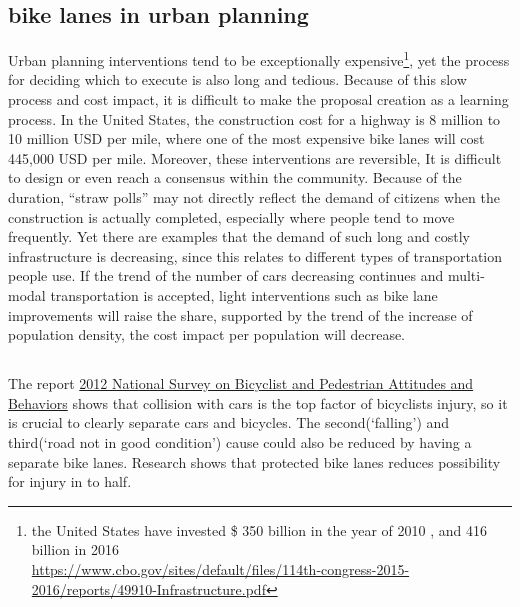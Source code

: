 \subsection{bike lanes in urban planning}
Urban planning interventions tend to be exceptionally expensive\footnote{the United States have invested \$ 350 billion in the year of 2010 \cite{musick2010public}, and 416 billion in 2016\\ \url{https://www.cbo.gov/sites/default/files/114th-congress-2015-2016/reports/49910-Infrastructure.pdf}}, yet the process for deciding which to execute is also long and tedious. Because of this slow process and cost impact, it is difficult to make the proposal creation as a learning process. In the United States, the construction cost for a highway is 8 million to 10 million USD per mile, where one of the most expensive bike lanes will cost 445,000 USD per mile. Moreover, these interventions are reversible, 
 It is difficult to design or even reach a consensus within the community. Because of the duration, ``straw polls'' may not directly reflect the demand of citizens when the construction is actually completed, especially where people tend to move frequently. Yet there are examples that the demand of such long and costly infrastructure is decreasing, since this relates to different types of transportation people use. If the trend of the number of cars decreasing continues and multi-modal transportation is accepted, light interventions such as bike lane improvements will raise the share, supported by the trend of the increase of population density, the cost impact per population will decrease.

\subsection{}

The report \underline{2012 National Survey on Bicyclist and Pedestrian Attitudes and Behaviors} shows that collision with cars is the top factor of bicyclists injury\cite{schroeder20132012}, so it is crucial to clearly separate cars and bicycles. The second(`falling') and third(`road not in good condition') cause could also be reduced by having a separate bike lanes. Research shows that protected bike lanes reduces possibility for injury in to half.\cite{teschke2012route}

